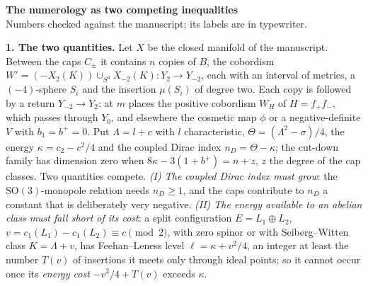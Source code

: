 \documentclass[10pt]{amsart}
\newcommand{\head}[1]{\par\vspace{2pt}\noindent\textbf{#1}\enspace}
\begin{document}
\begin{center}
{\bfseries\large The numerology as two competing inequalities}\\[2pt]
{\small Numbers checked against the manuscript; its labels are in typewriter.}
\end{center}
\vspace{-6pt}

\head{1. The two quantities.}
Let $X$ be the closed manifold of the manuscript. Between the caps $C_\pm$ it contains $n$ copies of $B$, the cobordism $W'=(-X_2(K))\cup_{S^3}X_{-2}(K)\colon Y_2\to Y_{-2}$, each with an interval of metrics, a $(-4)$-sphere $S_i$ and the insertion $\mu(S_i)$ of degree two. Each copy is followed by a return $Y_{-2}\to Y_2$: at $m$ places the positive cobordism $W_H$ of $H=f_+f_-$, which passes through $Y_0$, and elsewhere the cosmetic map $\phi$ or a negative-definite $V$ with $b_1=b^+=0$. Put $\Lambda=l+c$ with $l$ characteristic, $\Theta=(\Lambda^2-\sigma)/4$, the energy $\kappa=c_2-c^2/4$ and the coupled Dirac index $n_D=\Theta-\kappa$; the cut-down family has dimension zero when $8\kappa-3(1+b^+)=n+z$, $z$ the degree of the cap classes. Two quantities compete. \emph{(I) The coupled Dirac index must grow}: the $\mathrm{SO}(3)$-monopole relation needs $n_D\ge1$, and the caps contribute to $n_D$ a constant that is deliberately very negative. \emph{(II) The energy available to an abelian class must fall short of its cost}: a split configuration $E=L_1\oplus L_2$, $v=c_1(L_1)-c_1(L_2)\equiv c\pmod2$, with zero spinor or with Seiberg--Witten class $K=\Lambda+v$, has Feehan--Leness level $\ell=\kappa+v^2/4$, an integer at least the number $T(v)$ of insertions it meets only through ideal points; so it cannot occur once its \emph{energy cost} $-v^2/4+T(v)$ exceeds $\kappa$.
\end{document}

